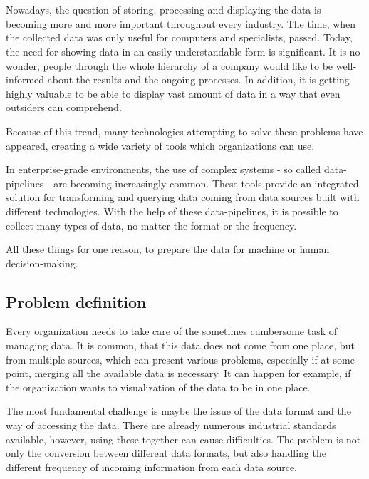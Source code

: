 \chapter{\bevezetes}


Nowadays, the question of storing, processing and displaying the data is becoming more and more important throughout every industry. The time, when the collected data was only useful for computers and specialists, passed. Today, the need for showing data in an easily understandable form is significant. It is no wonder, people through the whole hierarchy of a company would like to be well-informed about the results and the ongoing processes. In addition, it is getting highly valuable to be able to display vast amount of data in a way that even outsiders can comprehend.

Because of this trend, many technologies attempting to solve these problems have
appeared, creating a wide variety of tools which organizations can use.

In enterprise-grade environments, the use of complex systems - so called data-pipelines - are becoming increasingly common. These tools provide an integrated solution for transforming and querying data coming from data sources built with different technologies. With the help of these data-pipelines, it is possible to collect many types of data, no matter the format or the frequency.

All these things for one reason, to prepare the data for machine or human decision-making.

\section{Problem definition}

Every organization needs to take care of the sometimes cumbersome task of managing data. It is common, that this data does not come from one place, but from multiple sources, which can present various problems, especially if at some point, merging all the available data is necessary. It can happen for example, if the organization wants to visualization of the data to be in one place.

The most fundamental challenge is maybe the issue of the data format and the way of accessing the data. There are already numerous industrial standards available, however, using these together can cause difficulties. The problem is not only the conversion between different data formats, but also handling the different frequency of incoming information from each data source.

